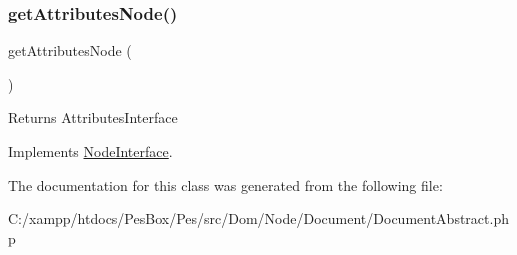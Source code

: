 \subsubsection{\texorpdfstring{get\+Attributes\+Node()}{getAttributesNode()}}
{\footnotesize\ttfamily get\+Attributes\+Node (\begin{DoxyParamCaption}{ }\end{DoxyParamCaption})}

\begin{DoxyReturn}{Returns}
Attributes\+Interface 
\end{DoxyReturn}


Implements \mbox{\hyperlink{interface_pes_1_1_dom_1_1_node_1_1_node_interface_a4722e7722b245351681b05d35f6694f3}{Node\+Interface}}.



The documentation for this class was generated from the following file\+:\begin{DoxyCompactItemize}
\item 
C\+:/xampp/htdocs/\+Pes\+Box/\+Pes/src/\+Dom/\+Node/\+Document/Document\+Abstract.\+php\end{DoxyCompactItemize}

